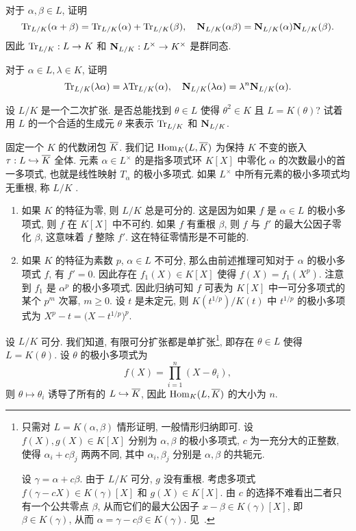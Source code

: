 \begin{exercise}
对于 $\alpha,\beta\in L$, 证明
  \[{\mathrm{Tr}}_{L/K}(\alpha+\beta)={\mathrm{Tr}}_{L/K}(\alpha)+{\mathrm{Tr}}_{L/K}(\beta),\quad
  {\mathbf{N}}_{L/K}(\alpha\beta)={\mathbf{N}}_{L/K}(\alpha){\mathbf{N}}_{L/K}(\beta).\]
因此 ${\mathrm{Tr}}_{L/K}:L\to K$ 和 ${\mathbf{N}}_{L/K}:L^\times\to K^\times$ 是群同态.
\end{exercise}

\begin{exercise}
对于 $\alpha\in L,\lambda\in K$, 证明
  \[{\mathrm{Tr}}_{L/K}(\lambda\alpha)=\lambda{\mathrm{Tr}}_{L/K}(\alpha),\quad
  {\mathbf{N}}_{L/K}(\lambda\alpha)=\lambda^n{\mathbf{N}}_{L/K}(\alpha).\]
\end{exercise}

\begin{exercise}
设 $L/K$ 是一个二次扩张. 是否总能找到 $\theta\in L$ 使得 $\theta^2\in K$ 且 $L=K(\theta)$? 试着用 $L$ 的一个合适的生成元 $\theta$ 来表示 ${\mathrm{Tr}}_{L/K}$ 和 ${\mathbf{N}}_{L/K}$.
\end{exercise}

固定一个 $K$ 的代数闭包 $\overline K$. 我们记 ${\mathrm{Hom}}_K(L,\overline K)$ 为保持 $K$ 不变的嵌入 $\tau:L\hookrightarrow\overline K$ 全体. 元素 $\alpha\in L^\times$ 的是指多项式环 $K[X]$ 中零化 $\alpha$ 的次数最小的首一多项式, 也就是线性映射 $T_\alpha$ 的极小多项式. 如果 $L^\times$ 中所有元素的极小多项式均无重根, 称 $L/K$ . 
\begin{example}
  \begin{enumerate}
    \item 如果 $K$ 的特征为零, 则 $L/K$ 总是可分的. 这是因为如果 $f$ 是 $\alpha\in L$ 的极小多项式, 则 $f$ 在 $K[X]$ 中不可约. 如果 $f$ 有重根 $\beta$, 则 $f$ 与 $f'$ 的最大公因子零化 $\beta$, 这意味着 $f$ 整除 $f'$. 这在特征零情形是不可能的.
    \item 如果 $K$ 的特征为素数 $p$, $\alpha\in L$ 不可分, 那么由前述推理可知对于 $\alpha$ 的极小多项式 $f$, 有 $f'=0$. 因此存在 $f_1(X)\in K[X]$ 使得 $f(X)=f_1(X^p)$.
    注意到 $f_1$ 是 $\alpha^p$ 的极小多项式. 因此归纳可知 $f$ 可表为 $K[X]$ 中一可分多项式的某个 $p^m$ 次幂, $m\ge 0$.
    设 $t$ 是未定元, 则 $K(t^{1/p})/K(t)$ 中 $t^{1/p}$ 的极小多项式为 $X^p-t=\bigl(X-t^{1/p}\bigr)^p$.
  \end{enumerate}
\end{example}

设 $L/K$ 可分. 我们知道, 有限可分扩张都是单扩张\footnote{只需对 $L=K(\alpha,\beta)$ 情形证明, 一般情形归纳即可. 设 $f(X),g(X)\in K[X]$ 分别为 $\alpha,\beta$ 的极小多项式, $c$ 为一充分大的正整数, 使得 $\alpha_i+c\beta_j$ 两两不同, 其中 $\alpha_i,\beta_j$ 分别是 $\alpha,\beta$ 的共轭元.

设 $\gamma=\alpha+c\beta$.
由于 $L/K$ 可分, $g$ 没有重根.
考虑多项式 $f(\gamma-cX)\in K(\gamma)[X]$ 和 $g(X)\in K[X]$. 由 $c$ 的选择不难看出二者只有一个公共零点 $\beta$, 从而它们的最大公因子 $x-\beta\in K(\gamma)[X]$, 即 $\beta\in K(\gamma)$, 从而 $\alpha=\gamma-c\beta\in K(\gamma)$. 见~\cite[\S3.2 定理2]{FengLiZhang2009}.}, 即存在 $\theta\in L$ 使得 $L=K(\theta)$. 设 $\theta$ 的极小多项式为
  \[f(X)=\prod_{i=1}^n (X-\theta_i),\]
则 $\theta\mapsto \theta_i$ 诱导了所有的 $L\hookrightarrow \overline K$, 因此 ${\mathrm{Hom}}_K(L,\overline K)$ 的大小为 $n$.

